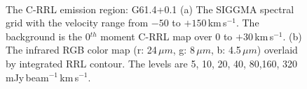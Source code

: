 \documentclass[manuscript]{aastex61}
\newcommand{\kms}{\,km\,s$^{-1}$}
\newcommand{\um}{\mu m}
\begin{document}
\begin{figure}[H]
	\centering
	\\
	\caption{The C-RRL emission region: G61.4+0.1
	(a) The SIGGMA spectral grid with the velocity range from $-50$ to $+150$\kms.
	The background is the 0$^{th}$ moment C-RRL map over $0$ to $+30$\kms.
	(b) The infrared RGB color map (r: 24\,$\um$, g: 8\,$\um$, b: 4.5\,$\um$) overlaid by integrated RRL contour.
	The levels are 5, 10, 20, 40, 80,160, 320 mJy\,beam$^{-1}$\kms.}
	\label{fig_crrl-g614}
\end{figure}
\end{document}
